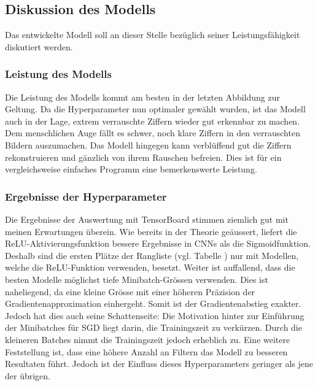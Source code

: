 \subsection{Diskussion des Modells}
Das entwickelte Modell soll an dieser Stelle bezüglich seiner Leistungsfähigkeit
diskutiert werden.

\subsubsection{Leistung des Modells}
Die Leistung des Modells kommt am besten in der letzten Abbildung zur
Geltung. Da die Hyperparameter nun optimaler gewählt wurden, ist das Modell auch
in der Lage, extrem verrauschte Ziffern wieder gut erkennbar zu machen. Dem
menschlichen Auge fällt es schwer, noch klare Ziffern in den verrauschten Bildern
auszumachen. Das Modell hingegen kann verblüffend gut die Ziffern rekonstruieren
und gänzlich von ihrem Rauschen befreien. Dies ist für ein vergleichsweise
einfaches Programm eine bemerkenswerte Leistung.

\subsubsection{Ergebnisse der Hyperparameter}
Die Ergebnisse der Auswertung mit TensorBoard stimmen ziemlich gut mit meinen
Erwartungen überein. Wie bereits in der Theorie geäussert, liefert die
ReLU-Aktivierungsfunktion bessere Ergebnisse in CNNs als die Sigmoidfunktion.
Deshalb sind die ersten Plätze der Rangliste (vgl. Tabelle ) nur mit Modellen, welche die
ReLU-Funktion verwenden, besetzt. Weiter ist auffallend, dass die besten Modelle
möglichst tiefe Minibatch-Grössen verwenden. Dies ist naheliegend, da eine
kleine Grösse mit einer höheren Präzision der Gradientenapproximation
einhergeht. Somit ist der Gradientenabstieg exakter. Jedoch hat dies auch seine
Schattenseite: Die Motivation hinter zur Einführung der
Minibatches für SGD liegt darin, die Trainingszeit zu verkürzen. Durch die
kleineren Batches nimmt die Trainingszeit jedoch erheblich zu.
Eine weitere Feststellung ist, dass eine höhere Anzahl an Filtern das Modell zu
besseren Resultaten führt. Jedoch ist der Einfluss dieses Hyperparameters
geringer als jene der übrigen.

